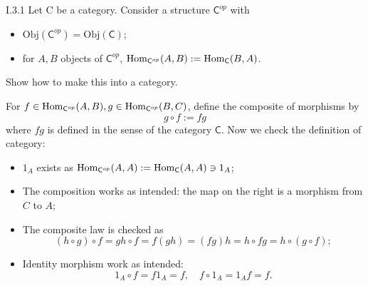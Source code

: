 \section{}
\begin{problem}{I.3.1}
Let \textsf{C} be a category. Consider a structure $\mathsf{C}^{op}$ with
\begin{itemize}
\setlength\itemsep{0pc}
\item $\text{Obj}(\mathsf{C}^{op}) = \text{Obj}(\mathsf{C})$;
\item for $A, B$ objects of $\mathsf{C}^{op}$, $\operatorname{Hom}_{\mathsf{C}^{op}}(A,B) := \operatorname{Hom}_\mathsf{C}(B,A)$.
\end{itemize}
Show how to make this into a category.
\end{problem}
\begin{sol}
For $f \in \operatorname{Hom}_{\mathsf{C}^{op}}(A,B), g \in \operatorname{Hom}_{\mathsf{C}^{op}}(B,C)$, define the composite of morphisms by
\[
g \circ f := fg     
\]
where $fg$ is defined in the sense of the category $\mathsf{C}$. Now we check the definition of category:
\begin{itemize}
\setlength\itemsep{0pt}
\item $1_A$ exists as $\operatorname{Hom}_{\mathsf{C}^{op}}(A,A) := \operatorname{Hom}_\mathsf{C}(A,A) \ni 1_A$; 
\item The composition works as intended: the map on the right is a morphism from $C$ to $A$;
\item The composite law is checked as
\[
(h \circ g) \circ f = gh \circ f = f(gh) = (fg)h = h \circ fg = h \circ (g \circ f);
\]
\item Identity morphism work as intended:
\[
1_A \circ f = f1_A = f, \quad f \circ 1_A = 1_Af = f.	
\]
\end{itemize}
\end{sol}

